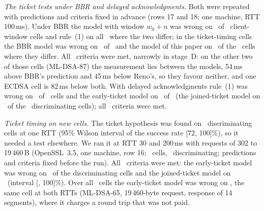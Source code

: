 \documentclass[sigconf,9pt,nonacm]{acmart}
\newcommand{\ms}{\,ms\xspace}
\begin{document}
\emph{The ticket tests under BBR and delayed acknowledgments.} Both were repeated with predictions and criteria fixed in advance (rows 17 and 18; one machine, RTT 100\ms). Under BBR the model with window $w_0+n$ was wrong on \GfBbrCWrong\ of \GfBbrCN\ client-window cells and rule~(1) on all \GfBbrRuleWrong\ where the two differ; in the ticket-timing cells the BBR model was wrong on \GfBbrDWrong\ of \GfBbrDN\ and the model of this paper on \GfBbrRenoWrong\ of the \GfBbrDDiff\ cells where they differ. All \GfBbrK\ criteria were met, narrowly in stage~D: on the other two of those cells (ML-DSA-87) the measurement lies between the models, 54\ms above BBR's prediction and 45\ms below Reno's, so they favour neither, and one ECDSA cell is 82\ms below both. With delayed acknowledgments rule~(1) was wrong on \GfDelCWrong\ of \GfDelCN\ cells and the early-ticket model on \GfDelEarlyAll\ of \GfDelDN\ (the joined-ticket model on \GfDelJoinedDiff\ of the \GfDelDDiff\ discriminating cells); all \GfDelK\ criteria were met.

\emph{Ticket timing on new cells.} The ticket hypothesis was found on \DDiff\ discriminating cells at one RTT (95\% Wilson interval of the success rate [72, 100]\%), so it needed a test elsewhere. We ran it at RTT 30 and 200\ms with requests of 302 to 19\,460\,B (OpenSSL~3.5, one machine, row 16; \GtwelveCells\ cells, \GtwelveDis\ discriminating; predictions and criteria fixed before the run). All \GtwelveK\ criteria were met: the early-ticket model was wrong on \GtwelveEarlyDis\ of the discriminating cells and the joined-ticket model on \GtwelveJoinedDis\ (interval [\GtwelveWilsonLo, 100]\%). Over all \GtwelveCells\ cells the early-ticket model was wrong on \GtwelveEarlyAll, the same cell at both RTTs (ML-DSA-65, 19\,460-byte request, response of 14 segments), where it charges a round trip that was not paid.
\end{document}
